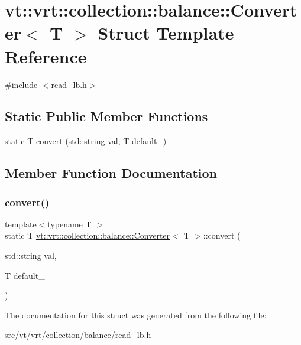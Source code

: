 \hypertarget{structvt_1_1vrt_1_1collection_1_1balance_1_1_converter}{}\section{vt\+:\+:vrt\+:\+:collection\+:\+:balance\+:\+:Converter$<$ T $>$ Struct Template Reference}
\label{structvt_1_1vrt_1_1collection_1_1balance_1_1_converter}


{\ttfamily \#include $<$read\+\_\+lb.\+h$>$}

\subsection*{Static Public Member Functions}
\begin{DoxyCompactItemize}
\item 
static T \hyperlink{structvt_1_1vrt_1_1collection_1_1balance_1_1_converter_a46076033d0cf03ba76b5f50269322da4}{convert} (std\+::string val, T default\+\_\+)
\end{DoxyCompactItemize}


\subsection{Member Function Documentation}
\mbox{\label{structvt_1_1vrt_1_1collection_1_1balance_1_1_converter_a46076033d0cf03ba76b5f50269322da4}} 
\subsubsection{\texorpdfstring{convert()}{convert()}}
{\footnotesize\ttfamily template$<$typename T $>$ \\
static T \hyperlink{structvt_1_1vrt_1_1collection_1_1balance_1_1_converter}{vt\+::vrt\+::collection\+::balance\+::\+Converter}$<$ T $>$\+::convert (\begin{DoxyParamCaption}\item[{std\+::string}]{val,  }\item[{T}]{default\+\_\+ }\end{DoxyParamCaption})\hspace{0.3cm}{\ttfamily [static]}}



The documentation for this struct was generated from the following file\+:\begin{DoxyCompactItemize}
\item 
src/vt/vrt/collection/balance/\hyperlink{read__lb_8h}{read\+\_\+lb.\+h}\end{DoxyCompactItemize}
